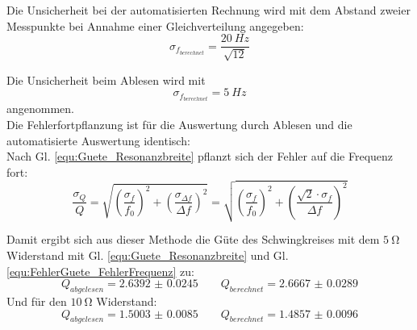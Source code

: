 \documentclass[12pt,a4paper]{article}
\begin{document}
Die Unsicherheit bei der automatisierten Rechnung wird mit dem Abstand zweier Messpunkte bei Annahme einer Gleichverteilung angegeben:
\begin{equation*}
\sigma_{f_{berechnet}} = \dfrac{\SI{20}{Hz}}{\sqrt{12}}
\end{equation*}

Die Unsicherheit beim Ablesen wird mit 
\begin{equation*}
\sigma_{f_{berechnet}} = \SI{5}{Hz}
\end{equation*}
angenommen.\\
Die Fehlerfortpflanzung ist für die Auswertung durch Ablesen und die automatisierte Auswertung identisch:\\
Nach Gl. \ref{equ:Guete_Resonanzbreite} pflanzt sich der Fehler auf die Frequenz fort:
\begin{equation}
\dfrac{\sigma_Q}{Q} = \sqrt{\left( \dfrac{\sigma_f}{f_0} \right)^2 + \left( \dfrac{\sigma_{\Delta f}}{\Delta f} \right)^2} = \sqrt{\left( \dfrac{\sigma_f}{f_0} \right)^2 + \left( \dfrac{\sqrt{2} \cdot \sigma _f}{\Delta f} \right)^2}
\label{equ:FehlerGuete_FehlerFrequenz}
\end{equation}

Damit ergibt sich aus dieser Methode die Güte des Schwingkreises mit dem $\SI{5}{\ohm}$ Widerstand mit Gl. \ref{equ:Guete_Resonanzbreite} und Gl. \ref{equ:FehlerGuete_FehlerFrequenz} zu:
\begin{equation*}
Q_{abgelesen} = \num{2.6392(245)} \qquad Q_{berechnet} = \num{2.6667(289)}
\end{equation*}
Und für den $\SI{10}{\ohm}$ Widerstand:
\begin{equation*}
Q_{abgelesen} = \num{1.5003(85)} \qquad Q_{berechnet} = \num{1.4857(96)}
\end{equation*}
\end{document}
